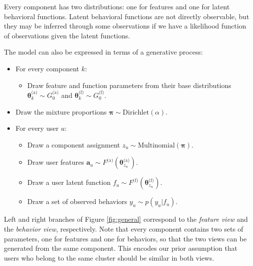 \documentclass[smallextended]{svjour3}          %
\begin{document}
Every component has two distributions: one for features and one for latent behavioral functions. Latent behavioral functions are not directly observable, but they may be inferred through some observations if we have a likelihood function of observations given the latent functions.   

The model can also be expressed in terms of a generative process:
\begin{itemize}
\item For every component $k$:
   \begin{itemize}
   \item Draw feature and function parameters from their base distributions $\boldsymbol{\theta}_k^{\text{(a)}} \sim G_0^{\text{(a)}}$ and $ \boldsymbol{\theta}_k^{\text{(f)}} \sim G_0^{\text{(f)}}$.
   \end{itemize}
\item Draw the mixture proportions $\boldsymbol{\pi} \sim \text{Dirichlet}(\alpha)$.
\item For every user $u$:
   \begin{itemize}
   \item Draw a component assignment $z_u \sim \text{Multinomial}(\boldsymbol{\pi})$.
   \item Draw user features  $\mathbf{a}_u \sim F^{\text{(a)}}(\boldsymbol{\theta}_{z_u}^{\text{(a)}})$. 
   \item Draw a user latent function $f_u \sim F^{\text{(f)}}(\boldsymbol{\theta}_{z_u}^{\text{(f)}})$.
   \item Draw a set of observed behaviors $y_u \sim p(y_u | f_u)$.
   \end{itemize}
\end{itemize}

Left and right branches of Figure \ref{fig:general}  correspond to the \textit{feature view} and the \textit{behavior view}, respectively. Note that every component contains two sets of parameters, one for features and one for behaviors, so that the two views can be generated from the same component. This encodes our prior assumption that users who belong to the same cluster should be similar in both views.
\end{document}
